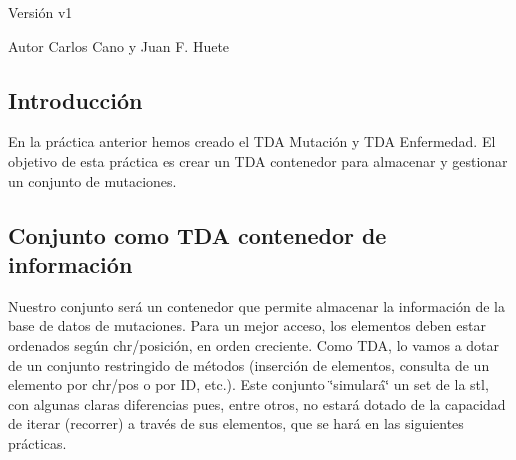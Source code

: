 \begin{DoxyVersion}{Versión}
v1 
\end{DoxyVersion}
\begin{DoxyAuthor}{Autor}
Carlos Cano y Juan F. Huete
\end{DoxyAuthor}
\hypertarget{index_introsec}{}\subsection{Introducción}\label{index_introsec}
En la práctica anterior hemos creado el T\+DA Mutación y T\+DA Enfermedad. El objetivo de esta práctica es crear un T\+DA contenedor para almacenar y gestionar un conjunto de mutaciones.\hypertarget{index_conjunto}{}\subsection{Conjunto como T\+D\+A contenedor de información}\label{index_conjunto}
Nuestro conjunto será un contenedor que permite almacenar la información de la base de datos de mutaciones. Para un mejor acceso, los elementos deben estar ordenados según chr/posición, en orden creciente. Como T\+DA, lo vamos a dotar de un conjunto restringido de métodos (inserción de elementos, consulta de un elemento por chr/pos o por ID, etc.). Este conjunto \char`\"{}simulará\char`\"{} un set de la stl, con algunas claras diferencias pues, entre otros, no estará dotado de la capacidad de iterar (recorrer) a través de sus elementos, que se hará en las siguientes prácticas.

